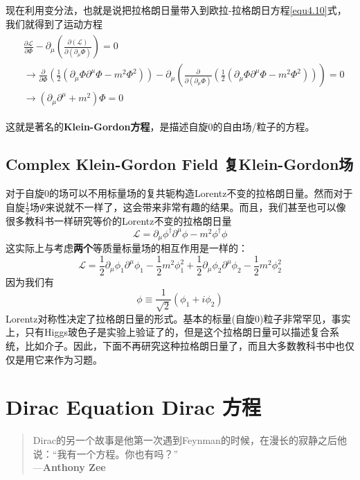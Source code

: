 现在利用变分法，也就是说把拉格朗日量带入到欧拉-拉格朗日方程\eqref{equ4.10}式，我们就得到了运动方程
\begin{align}
\label{equ6.5}
\begin{split}
&\frac{\partial\mathscr{L}}{\partial\Phi}-\partial_\mu\left(\frac{\partial(\mathscr{L})}{\partial(\partial_\mu\Phi)}\right)=0\\
&\rightarrow\frac{\partial}{\partial\Phi}\left(\frac{1}{2}(\partial_\mu\Phi\partial^\mu\Phi-m^2\Phi^2)\right)-\partial_\mu\left(\frac{\partial}{\partial(\partial_\mu\Phi)}\left(\frac{1}{2}(\partial_\mu\Phi\partial^\mu\Phi-m^2\Phi^2)\right)\right)=0 \\
&\rightarrow(\partial_\mu\partial^\mu+m^2)\Phi=0
\end{split}
\end{align}

这就是著名的{\bfseries Klein-Gordon方程}，是描述自旋$0$的自由场/粒子的方程。

\subsection[复Klein-Gordon场]{Complex Klein-Gordon Field \quad 复Klein-Gordon场}\label{sec6.2.1}

对于自旋$0$的场可以不用标量场的复共轭构造Lorentz不变的拉格朗日量。然而对于自旋$\frac{1}{2}$场$\Psi$来说就不一样了，这会带来非常有趣的结果。而且，我们甚至也可以像很多教科书一样研究等价的Lorentz不变的拉格朗日量
\[\mathscr{L}=\partial_\mu\phi^\dagger\partial^\mu\phi-m^2\phi^\dagger\phi \]
这实际上与考虑{\bfseries 两个}等质量标量场的相互作用是一样的：
\[\mathscr{L}=\frac{1}{2}\partial_\mu\phi_1\partial^\mu\phi_1-\frac{1}{2}m^2\phi_1^2+\frac{1}{2}\partial_\mu\phi_2\partial^\mu\phi_2-\frac{1}{2}m^2\phi_2^2 \]
因为我们有
\[\phi\equiv\frac{1}{\sqrt2}(\phi_1+i\phi_2) \]
Lorentz对称性决定了拉格朗日量的形式。基本的标量(自旋$0$)粒子非常罕见，事实上，只有Higgs玻色子是实验上验证了的，但是这个拉格朗日量可以描述复合系统，比如介子。因此，下面不再研究这种拉格朗日量了，而且大多数教科书中也仅仅是用它来作为习题。

\section[Dirac方程]{Dirac Equation \quad Dirac 方程}\label{sec6.3}
\begin{quote}
Dirac的另一个故事是他第一次遇到Feynman的时候，在漫长的寂静之后他说：“我有一个方程。你也有吗？”\\
\phantom{Dirac的另一个故事是他第一次遇到}---{\bfseries Anthony Zee}
\end{quote}

